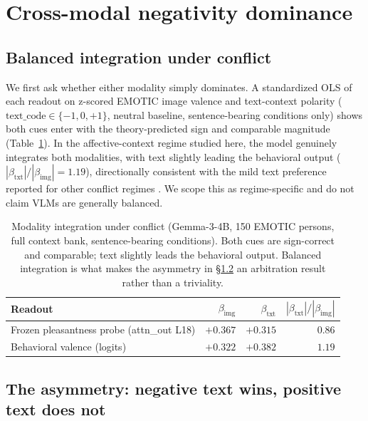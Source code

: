 \documentclass{article}
\newcommand{\gemma}{Gemma-3-4B}
\newcommand{\betaimg}{\beta_{\text{img}}}
\newcommand{\betatxt}{\beta_{\text{txt}}}
\begin{document}
\section{Cross-modal negativity dominance}
\label{sec:conflict}

\subsection{Balanced integration under conflict}
\label{sec:integration}

We first ask whether either modality simply dominates. A standardized OLS of each readout on z-scored EMOTIC image valence and text-context polarity ($\text{text\_code} \in \{-1, 0, +1\}$, neutral baseline, sentence-bearing conditions only) shows both cues enter with the theory-predicted sign and comparable magnitude (Table~\ref{tab:integration}). In the affective-context regime studied here, the model genuinely integrates both modalities, with text slightly leading the behavioral output ($|\betatxt|/|\betaimg| = 1.19$), directionally consistent with the mild text preference reported for other conflict regimes \citep{deng2025blindfaith}. We scope this as regime-specific and do not claim VLMs are generally balanced.

\begin{table}[t]
  \caption{Modality integration under conflict (\gemma{}, 150 EMOTIC persons, full context bank, sentence-bearing conditions). Both cues are sign-correct and comparable; text slightly leads the behavioral output. Balanced integration is what makes the asymmetry in \S\ref{sec:asymmetry} an arbitration result rather than a triviality.}
  \label{tab:integration}
  \centering
  \begin{tabular}{lrrr}
    \toprule
    Readout & $\betaimg$ & $\betatxt$ & $|\betatxt|/|\betaimg|$ \\
    \midrule
    Frozen pleasantness probe (attn\_out L18) & $+0.367$ & $+0.315$ & $0.86$ \\
    Behavioral valence (logits)               & $+0.322$ & $+0.382$ & $1.19$ \\
    \bottomrule
  \end{tabular}
\end{table}

\subsection{The asymmetry: negative text wins, positive text does not}
\label{sec:asymmetry}
\end{document}
